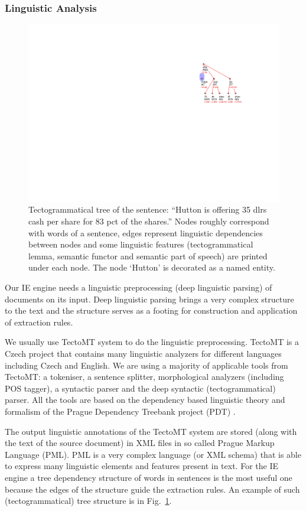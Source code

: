 \subsubsection{Linguistic Analysis}


\begin{figure}
\centerline{\includegraphics[angle=90, width=0.4\hsize]{tree}}
\caption{Tectogrammatical tree of the sentence: ``Hutton is offering 35 dlrs cash per share for 83 pct of the shares.''
Nodes roughly correspond with words of a sentence, edges represent linguistic dependencies between nodes and some linguistic features (tectogrammatical lemma, semantic functor and semantic part of speech) are printed under each node. The node `Hutton' is decorated as a named entity.}
\label{img:tree}
\end{figure}


Our IE engine needs a linguistic preprocessing (deep linguistic parsing) of documents on its input. Deep linguistic parsing brings a very complex structure to the text and the structure serves as a footing for construction and application of extraction rules. 

We usually use TectoMT system \citep{dedek:ZaPtTectoMTHighly2008} to do the linguistic preprocessing. TectoMT is a Czech project that contains many linguistic analyzers for different languages including Czech and English. We are using a majority of applicable tools from TectoMT: a tokeniser, a sentence splitter, morphological analyzers (including POS tagger), a syntactic parser and the deep syntactic (tectogrammatical) parser. All the tools are based on the dependency based linguistic theory and formalism of the Prague Dependency Treebank project (PDT) \citep{dedek:PDT20_CD}.

The output linguistic annotations of the TectoMT system are stored (along with the text of the source document) in XML files in so called Prague Markup Language (PML). PML is a very complex language (or XML schema) that is able to express many linguistic elements and features present in text. For the IE engine a tree dependency structure of words in sentences is the most useful one because the edges of the structure guide the extraction rules. An example of such (tectogrammatical) tree structure is in Fig.~\ref{img:tree}.


